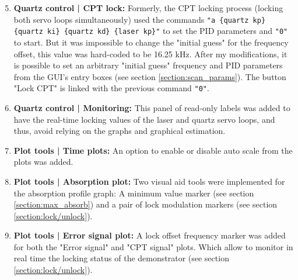 \documentclass[a4paper,12pt]{article}
\begin{document}
\begin{enumerate}[wide, labelwidth=!, labelindent=0pt]
    \setcounter{enumi}{4} %
    \item \textbf{Quartz control | CPT lock:} \newline Formerly, the CPT locking process (locking both servo loops simultaneously) used the commands \mbox{\texttt{"a \{quartz kp\} \{quartz ki\} \{quartz kd\} \{laser kp\}"}} to set the PID parameters and \texttt{"0"} to start. But it was impossible to change the "initial guess" for the frequency offset, this value was hard-coded to be 16.25 kHz.
    \vfill
    After my modifications, it is possible to set an arbitrary "initial guess" frequency and PID parameters from the GUI's entry boxes (see section \ref{section:scan_params}).
    \newline The button "Lock CPT" is linked with the previous command \texttt{"0"}.
    \item \textbf{Quartz control | Monitoring:} \newline This panel of read-only labels was added to have the real-time locking values of the laser and quartz servo loops, and thus, avoid relying on the graphs and graphical estimation.
	\item \textbf{Plot tools | Time plots:} \newline An option to enable or disable auto scale from the plots was added. 
	\item \textbf{Plot tools | Absorption plot:} \newline  Two visual aid tools were implemented for the absorption profile graph: A minimum value marker (see section \ref{section:max_absorb}) and a pair of lock modulation markers (see section \ref{section:lock/unlock}).

	\item \textbf{Plot tools | Error signal plot:} \newline A lock offset frequency marker was added for both the "Error signal" and "CPT signal" plots. Which allow to monitor in real time the locking status of the demonstrator (see section \ref{section:lock/unlock}).
	
\end{enumerate}
\end{document}
